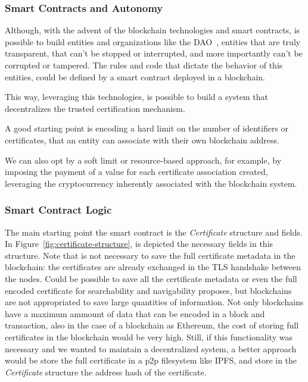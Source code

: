 \subsubsection{Smart Contracts and Autonomy}
Although, with the advent of the blockchain technologies and smart contracts, is possible to build entities and organizations like the DAO~\cite{ralphc.merkle2016}, entities that are truly transparent, that can't be stopped or interrupted, and more importantly can't be corrupted or tampered.
The rules and code that dictate the behavior of this entities, could be defined by a smart contract deployed in a blockchain.

This way, leveraging this technologies, is possible to build a system that decentralizes the trusted certification mechanism.

A good starting point is encoding a hard limit on the number of identifiers or certificates, that an entity can associate with their own blockchain address.

We can also opt by a soft limit or resource-based approach, for example, by imposing the payment of a value for each certificate association created, leveraging the cryptocurrency inherently associated with the blockchain system.

\subsubsection{Smart Contract Logic}
The main starting point the smart contract is the \textit{Certificate} structure and fields.
In Figure~\ref{fig:certificate-structure}, is depicted the necessary fields in this structure.
Note that is not necessary to save the full certificate metadata in the blockchain: the certificates are already exchanged in the TLS handshake between the nodes.
Could be possible to save all the certificate metadata or even the full encoded certificate for searchability and navigability proposes, but blockchains are not appropriated to save large quantities of information.
Not only blockchains have a maximum ammount of data that can be encoded in a block and transaction, also in the case of a blockchain as Ethereum, the cost of storing full certificates in the blockchain would be very high.
Still, if this functionality was necessary and we wanted to maintain a decentralized system, a better approach would be store the full certificate in a \ac{p2p} filesystem like \ac{IPFS}, and store in the \textit{Certificate} structure the address hash of the certificate.

